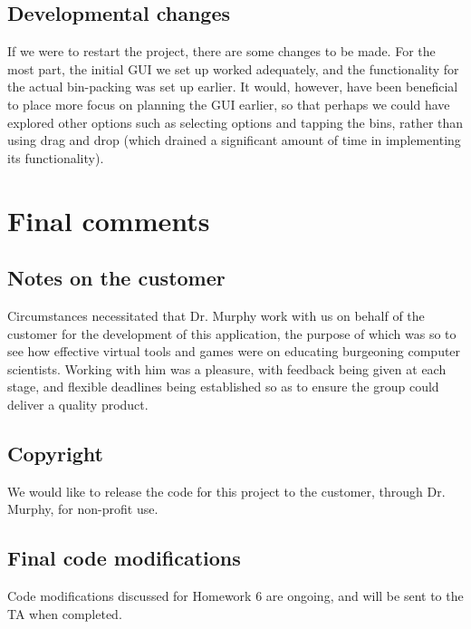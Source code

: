 \documentclass[11pt]{article}
\begin{document}
\subsection{Developmental changes}

If we were to restart the project, there are some changes to be made.  For the
most part, the initial GUI we set up worked adequately, and the functionality
for the actual bin-packing was set up earlier.  It would, however, have been
beneficial to place more focus on planning the GUI earlier, so that perhaps we
could have explored other options such as selecting options and tapping the
bins, rather than using drag and drop (which drained a significant amount of
time in implementing its functionality).

\section{Final comments}

\subsection{Notes on the customer}

Circumstances necessitated that Dr. Murphy work with us on behalf of the
customer for the development of this application, the purpose of which was so to
see how effective virtual tools and games were on educating burgeoning computer
scientists.  Working with him was a pleasure, with feedback being given at each
stage, and flexible deadlines being established so as to ensure the group could
deliver a quality product.

\subsection{Copyright}

We would like to release the code for this project to the customer, through
Dr. Murphy, for non-profit use.

\subsection{Final code modifications}

Code modifications discussed for Homework 6 are ongoing, and will be sent to the
TA when completed.
\end{document}
